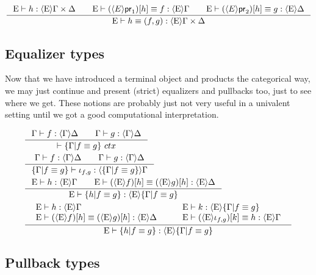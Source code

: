 \begin{equation}
\inference{\jhom{\greek{E}}{\product{\Gamma}{\Delta}}{h}
           \qquad
           \jhomeq{\greek{E}}{\Gamma}{\jcomp{E}{h}{\proj1}}{f}
           \qquad
           \jhomeq{\greek{E}}{\Delta}{\jcomp{E}{h}{\proj2}}{g}}
          {\jhomeq{\greek{E}}{\product{\Gamma}{\Delta}}{h}{\pairp{f,g}}}
\end{equation}

\subsection{Equalizer types}
Now that we have introduced a terminal object and products the categorical way,
we may just continue and present (strict) equalizers and pullbacks too, just to
see where we get. These notions are probably just not very useful in a univalent
setting until we got a good computational interpretation.

\begin{align}
& \inference{\jhom{\Gamma}{\Delta}{f}\qquad\jhom{\Gamma}{\Delta}{g}}{\jctx{\jequalizer{\Gamma}{f}{g}}}\\
& \inference{\jhom{\Gamma}{\Delta}{f}\qquad\jhom{\Gamma}{\Delta}{g}}{\jhom{\jequalizer{\Gamma}{f}{g}}{\Gamma}{\jequalizerin{f}{g}}}\\
& \inference{\jhom{\greek{E}}{\Gamma}{h}\qquad\jhomeq{\greek{E}}{\Delta}{\jcomp{\greek{E}}{h}{f}}{\jcomp{\greek{E}}{h}{g}}}{\jhom{\greek{E}}{\jequalizer{\Gamma}{f}{g}}{\jequalizer{h}{f}{g}}}\\
& \inference{
  {\begin{array}{l}
    \jhom{\greek{E}}{\Gamma}{h}\\
    \jhomeq{\greek{E}}{\Delta}{\jcomp{\greek{E}}{h}{f}}{\jcomp{\greek{E}}{h}{g}}
  \end{array}}
  \qquad
  {\begin{array}{l}
    \jhom{\greek{E}}{\jequalizer{\Gamma}{f}{g}}{k}\\
    \jhomeq{\greek{E}}{\Gamma}{\jcomp{\greek{E}}{k}{\jequalizerin{f}{g}}}{h}
  \end{array}}
}
  {\jhom{\greek{E}}{\jequalizer{\Gamma}{f}{g}}{\jequalizer{h}{f}{g}}}
\end{align}

\subsection{Pullback types}

